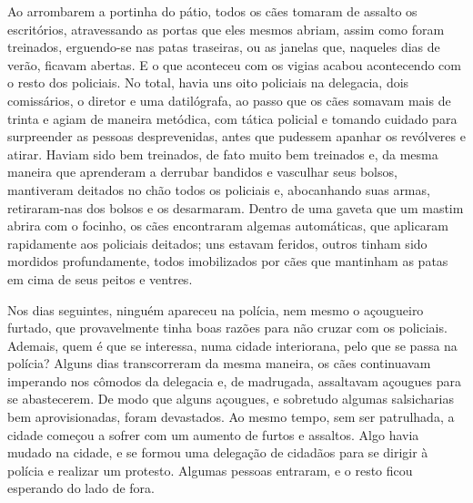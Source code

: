Ao arrombarem a portinha do pátio, todos os cães tomaram de assalto os
escritórios, atravessando as portas que eles mesmos abriam, assim como
foram treinados, erguendo-se nas patas traseiras, ou as janelas que,
naqueles dias de verão, ficavam abertas. E o que aconteceu com os vigias
acabou acontecendo com o resto dos policiais. No total, havia uns oito
policiais na delegacia, dois comissários, o diretor e uma datilógrafa,
ao passo que os cães somavam mais de trinta e agiam de maneira metódica,
com tática policial e tomando cuidado para surpreender as pessoas
desprevenidas, antes que pudessem apanhar os revólveres e atirar. Haviam
sido bem treinados, de fato muito bem treinados e, da mesma maneira que
aprenderam a derrubar bandidos e vasculhar seus bolsos, mantiveram
deitados no chão todos os policiais e, abocanhando suas armas,
retiraram-nas dos bolsos e os desarmaram. Dentro de uma gaveta que um
mastim abrira com o focinho, os cães encontraram algemas automáticas,
que aplicaram rapidamente aos policiais deitados; uns estavam feridos,
outros tinham sido mordidos profundamente, todos imobilizados por cães
que mantinham as patas em cima de seus peitos e ventres.



Nos dias seguintes, ninguém apareceu na polícia, nem mesmo o açougueiro
furtado, que provavelmente tinha boas razões para não cruzar com os
policiais. Ademais, quem é que se interessa, numa cidade interiorana,
pelo que se passa na polícia? Alguns dias transcorreram da mesma
maneira, os cães continuavam imperando nos cômodos da delegacia e, de
madrugada, assaltavam açougues para se abastecerem. De modo que alguns
açougues, e sobretudo algumas salsicharias bem aprovisionadas, foram
devastados. Ao mesmo tempo, sem ser patrulhada, a cidade começou a
sofrer com um aumento de furtos e assaltos. Algo havia mudado na cidade,
e se formou uma delegação de cidadãos para se dirigir à polícia e
realizar um protesto. Algumas pessoas entraram, e o resto ficou
esperando do lado de fora.

